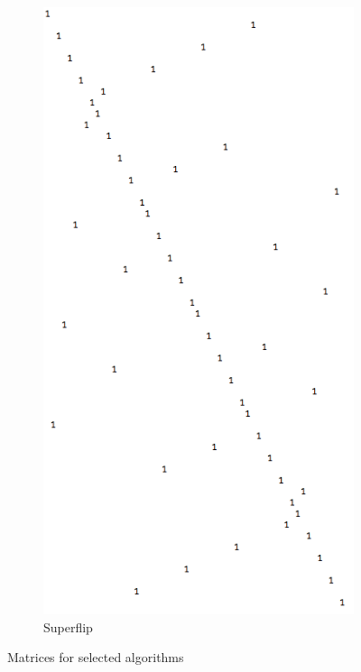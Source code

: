 \documentclass[11pt, oneside]{article}
\theoremstyle{plain}
\begin{document}
\begin{figure}[h!]
\begin{subfigure}[h]{0.4 \textwidth}
      \includegraphics[scale=0.3]{superflip}
      \caption{Superflip}
  \end{subfigure}
  \caption{Matrices for selected algorithms}
\end{figure}
\end{document}
